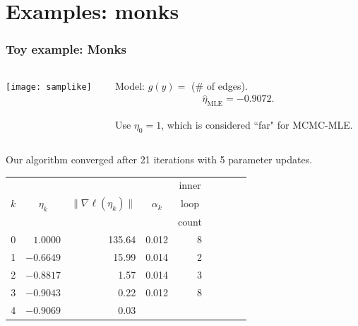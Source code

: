 \documentclass[ 10pt]{beamer}
\newcommand{\etaMLE}{\hat{\eta}_{\textrm{MLE}}}
\begin{document}
\section{Examples: monks}
\frame
{
  \frametitle{Toy example: Monks}  

\begin{columns}[t]
\begin{column}[T]{0.3\textwidth}
\texttt{[image: samplike]}
\end{column}

\begin{column}[r]{0.7\textwidth}
Model: $g(y) =$ (\# of edges).
\begin{align*}
	\etaMLE = -0.9072.
\end{align*}


Use $\eta_0 = 1$, which is considered ``far" for MCMC-MLE.%
\end{column}
\end{columns}

Our algorithm converged after 21 iterations with 5 parameter updates.
{\footnotesize
\begin{table}
\begin{center}
\begin{tabular}{rrrrrrlrr}
  \hline
    &  &  &  & \multicolumn{1}{c}{inner}\\
  \multicolumn{1}{c}{$k$} & 
  \multicolumn{1}{c}{$\eta_k$} &
  \multicolumn{1}{c}{$\lVert \nabla \ell(\eta_k) \rVert$} &
  \multicolumn{1}{c}{$\alpha_k$} &
  \multicolumn{1}{c}{loop }\\
    &  &  &  & \multicolumn{1}{c}{count}\\
  \hline
   0 &  $1.0000$ & 135.64 &  0.012 & 8\\
   1 & $-0.6649$ & 15.99  &  0.014 & 2 \\
   2 & $-0.8817$ & 1.57   &  0.014 & 3 \\
   3 & $-0.9043$ & 0.22   &  0.012 & 8 \\
   4 & $-0.9069$ & 0.03   &  &  \\
   \hline
\end{tabular} \label{T:Sampson redo}
\end{center}
\end{table}}
}
\end{document}

